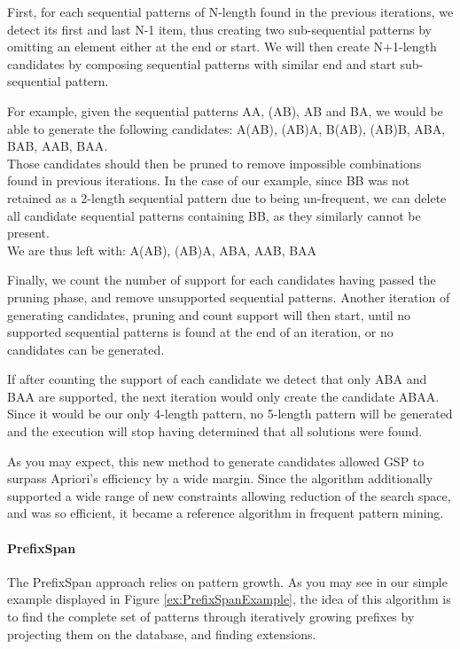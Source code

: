 \documentclass{eplmastersthesis}
\begin{document}
First, for each sequential patterns of N-length found in the previous iterations, we detect its first and last N-1 item, thus creating two sub-sequential patterns by omitting an element either at the end or start. We will then create N+1-length candidates by composing sequential patterns with similar end and start sub-sequential pattern. \newline

For example, given the sequential patterns AA, (AB), AB and BA, we would be able to generate the following candidates: A(AB), (AB)A, B(AB), (AB)B, ABA, BAB, AAB, BAA. \\
Those candidates should then be pruned to remove impossible combinations found in previous iterations. In the case of our example, since BB was not retained as a 2-length sequential pattern due to being un-frequent, we can delete all candidate sequential patterns containing BB, as they similarly cannot be present. \\
We are thus left with: A(AB), (AB)A, ABA, AAB, BAA \newline

Finally, we count the number of support for each candidates having passed the pruning phase, and remove unsupported sequential patterns. Another iteration of generating candidates, pruning and count support will then start, until no supported sequential patterns is found at the end of an iteration, or no candidates can be generated. \newline

If after counting the support of each candidate we detect that only ABA and BAA are supported, the next iteration would only create the candidate ABAA. Since it would be our only 4-length pattern, no 5-length pattern will be generated and the execution will stop having determined that all solutions were found. \newline

As you may expect, this new method to generate candidates allowed GSP to surpass Apriori's efficiency by a wide margin. Since the algorithm additionally supported a wide range of new constraints allowing reduction of the search space, and was so efficient, it became a reference algorithm in frequent pattern mining.

\paragraph{PrefixSpan}

The PrefixSpan approach \cite{pei2004mining} relies on pattern growth. As you may see in our simple example displayed in Figure \ref{ex:PrefixSpanExample}, the idea of this algorithm is to find the complete set of patterns through iteratively growing prefixes by projecting them on the database, and finding extensions. \newline
\end{document}

